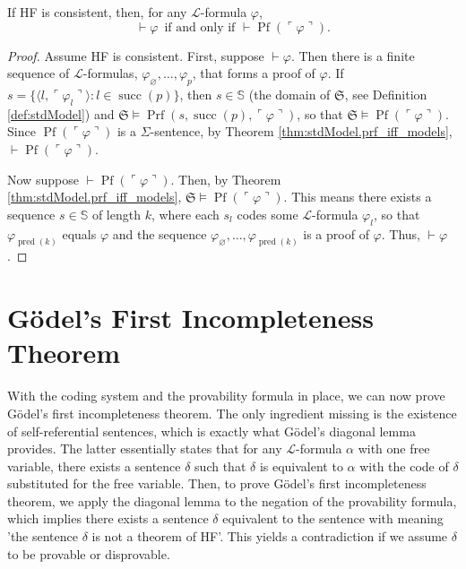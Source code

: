 \begin{theorem}
    \label{thm:prf_iff_prf_Pf_code}
    \leanok
    If HF is consistent, then, for any $\mathcal{L}$-formula $\varphi$,
    $$
    \vdash \varphi \,\text{ if and only if } \vdash \operatorname{Pf}(\ulcorner{\varphi}\urcorner).
    $$
\end{theorem}

\begin{proof}
    Assume HF is consistent. First, suppose $\vdash \varphi$.
    Then there is a finite sequence of $\mathcal{L}$-formulas, $\varphi_{\varnothing}, \ldots, 
    \varphi_p$, that forms a proof of $\varphi$.
    If $s = \{\langle l, \ulcorner{\varphi_l}\urcorner \rangle : l \in \operatorname{succ}(p) \}$,
    then $s \in \mathbb{S}$ (the domain of $\mathfrak{S}$, see Definition \ref{def:stdModel}) and
    $\mathfrak{S} \vDash \operatorname{Prf}(s, \operatorname{succ}(p), 
    \ulcorner{\varphi}\urcorner)$, 
    so that $\mathfrak{S} \vDash \operatorname{Pf}(\ulcorner{\varphi}\urcorner)$.
    Since $\operatorname{Pf}(\ulcorner{\varphi}\urcorner)$ is a $\Sigma$-sentence,
    by Theorem \ref{thm:stdModel.prf_iff_models}, 
    $\vdash \operatorname{Pf}(\ulcorner{\varphi}\urcorner)$.
    
    Now suppose $\vdash \operatorname{Pf}(\ulcorner{\varphi}\urcorner)$.
    Then, by Theorem \ref{thm:stdModel.prf_iff_models}, 
    $\mathfrak{S} \vDash \operatorname{Pf}(\ulcorner{\varphi}\urcorner)$.
    This means there exists a sequence $s \in \mathbb{S}$ of length $k$,
    where each $s_l$ codes some $\mathcal{L}$-formula $\varphi_l$, 
    so that $\varphi_{\operatorname{pred}(k)}$ equals $\varphi$ and the sequence
    $\varphi_{\varnothing}, \ldots, \varphi_{\operatorname{pred}(k)}$ is a proof of $\varphi$.
    Thus, $\vdash \varphi$.
\end{proof}

\chapter{Gödel’s First Incompleteness Theorem}

With the coding system and the provability formula in place, 
we can now prove Gödel’s first incompleteness theorem.
The only ingredient missing is the existence of self-referential sentences, 
which is exactly what Gödel’s diagonal lemma provides.
The latter essentially states that for any $\mathcal{L}$-formula $\alpha$ with one free variable,
there exists a sentence $\delta$ such that $\delta$ is equivalent to $\alpha$ with the code
of $\delta$ substituted for the free variable.
Then, to prove Gödel’s first incompleteness theorem, we apply the diagonal lemma to the negation
of the provability formula, which implies there exists a sentence $\delta$ equivalent to the 
sentence with meaning 'the sentence $\delta$ is not a theorem of HF'.
This yields a contradiction if we assume $\delta$ to be provable or disprovable.


